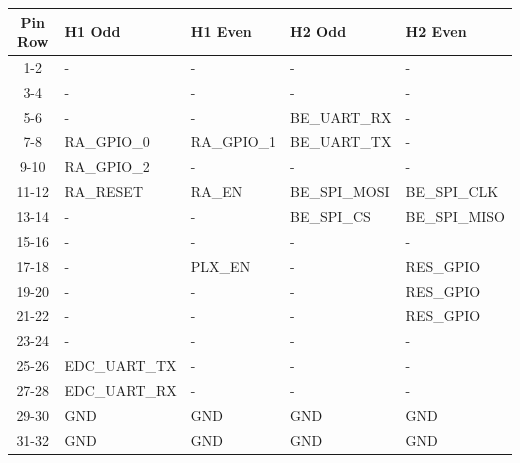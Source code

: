 \begin{table}[!h]
    \centering
    \begin{tabular}{cllll}
        \toprule[1.5pt]
        \textbf{Pin Row}   & \textbf{H1 Odd}  & \textbf{H1 Even} & \textbf{H2 Odd} & \textbf{H2 Even} \\
        \midrule
        1-2                & -                & -                & -               & -                \\
        3-4                & -                & -                & -               & -                \\
        5-6                & -                & -                & BE\_UART\_RX    & -                \\
        7-8                & RA\_GPIO\_0      & RA\_GPIO\_1      & BE\_UART\_TX    & -                \\
        9-10               & RA\_GPIO\_2      & -                & -               & -                \\
        11-12              & RA\_RESET        & RA\_EN           & BE\_SPI\_MOSI   & BE\_SPI\_CLK     \\
        13-14              & -                & -                & BE\_SPI\_CS     & BE\_SPI\_MISO    \\
        15-16              & -                & -                & -               & -                \\
        17-18              & -                & PLX\_EN          & -               & RES\_GPIO      \\
        19-20              & -                & -                & -               & RES\_GPIO      \\
        21-22              & -                & -                & -               & RES\_GPIO      \\
        23-24              & -                & -                & -               & -                \\
        25-26              & EDC\_UART\_TX    & -                & -               & -                \\
        27-28              & EDC\_UART\_RX    & -                & -               & -                \\
        29-30              & GND              & GND              & GND             & GND              \\
        31-32              & GND              & GND              & GND             & GND              \\

\end{tabular}
\end{table}
